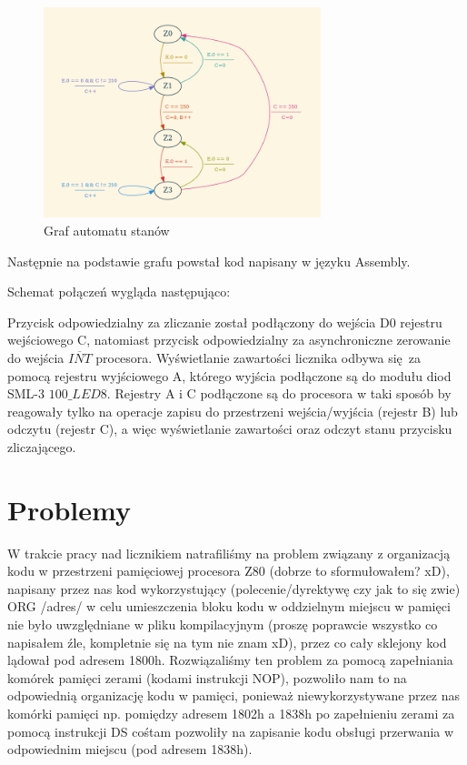 \documentclass[fleqn]{article}
\begin{document}
\begin{figure}[H]
	\centering
	\includegraphics[width=0.72\textwidth]{img/graph.png}
	\caption{Graf automatu stanów}
	\label{fig:graph}
\end{figure}

Następnie na podstawie grafu powstał kod napisany w języku Assembly.

\noindent\begin{minipage}{.45\textwidth}
	
\end{minipage}\hfill
\noindent\begin{minipage}{.45\textwidth}
	
\end{minipage}\hfill

Schemat połączeń wygląda następująco:


Przycisk odpowiedzialny za zliczanie został podłączony do wejścia D0 rejestru wejściowego C, natomiast przycisk odpowiedzialny za asynchroniczne zerowanie do wejścia $\overline{INT}$ procesora.
Wyświetlanie zawartości licznika odbywa się za pomocą rejestru wyjściowego A, którego wyjścia podłączone są do modułu diod SML-3 $\textit{100\_LED8}$. Rejestry A i C podłączone są do procesora w taki sposób by reagowały tylko na operacje zapisu do przestrzeni wejścia/wyjścia (rejestr B) lub odczytu (rejestr C), a więc wyświetlanie zawartości oraz odczyt stanu przycisku zliczającego.


\section{Problemy}
W trakcie pracy nad licznikiem natrafiliśmy na problem związany z organizacją kodu w przestrzeni pamięciowej procesora Z80 (dobrze to sformułowałem? xD), napisany przez nas kod wykorzystujący (polecenie/dyrektywę czy jak to się zwie) ORG /adres/ w celu umieszczenia bloku kodu w oddzielnym miejscu w pamięci nie było uwzględniane w pliku kompilacyjnym (proszę poprawcie wszystko co napisałem źle, kompletnie się na tym nie znam xD), przez co cały sklejony kod lądował pod adresem 1800h. Rozwiązaliśmy ten problem za pomocą zapełniania komórek pamięci zerami (kodami instrukcji NOP), pozwoliło nam to na odpowiednią organizację kodu w pamięci, ponieważ niewykorzystywane przez nas komórki pamięci np. pomiędzy adresem 1802h a 1838h po zapełnieniu zerami za pomocą instrukcji DS cośtam pozwoliły na zapisanie kodu obsługi przerwania w odpowiednim miejscu (pod adresem 1838h).
\end{document}
